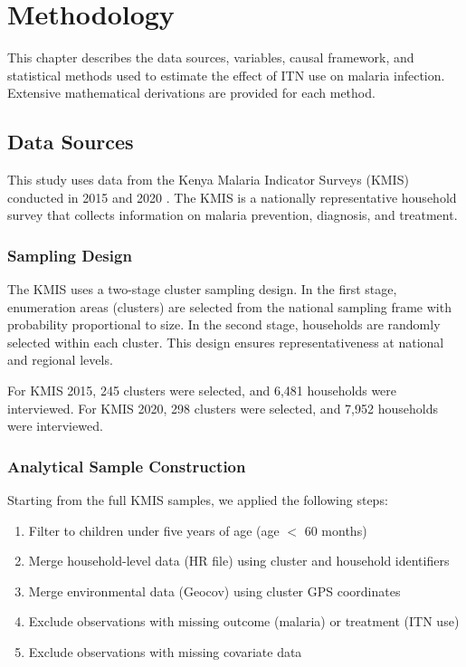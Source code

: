 \chapter{Methodology}

This chapter describes the data sources, variables, causal framework, and statistical methods used to estimate the effect of ITN use on malaria infection. Extensive mathematical derivations are provided for each method.

\section{Data Sources}

This study uses data from the Kenya Malaria Indicator Surveys (KMIS) conducted in 2015 and 2020 \citep{kmis2015report, kmis2020report}. The KMIS is a nationally representative household survey that collects information on malaria prevention, diagnosis, and treatment.

\subsection{Sampling Design}

The KMIS uses a two-stage cluster sampling design. In the first stage, enumeration areas (clusters) are selected from the national sampling frame with probability proportional to size. In the second stage, households are randomly selected within each cluster. This design ensures representativeness at national and regional levels.

For KMIS 2015, 245 clusters were selected, and 6,481 households were interviewed. For KMIS 2020, 298 clusters were selected, and 7,952 households were interviewed.

\subsection{Analytical Sample Construction}

Starting from the full KMIS samples, we applied the following steps:

\begin{enumerate}
	\item Filter to children under five years of age (age $<$ 60 months)
	\item Merge household-level data (HR file) using cluster and household identifiers
	\item Merge environmental data (Geocov) using cluster GPS coordinates
	\item Exclude observations with missing outcome (malaria) or treatment (ITN use)
	\item Exclude observations with missing covariate data
\end{enumerate}

